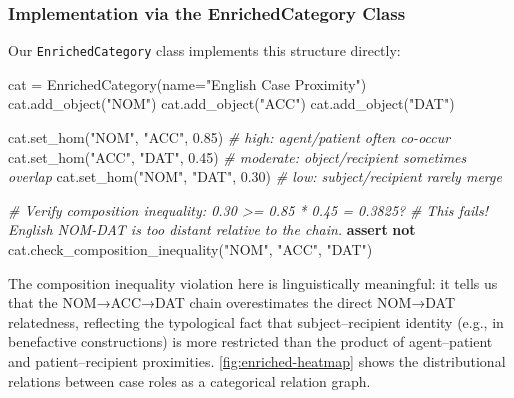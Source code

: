 \documentclass[
]{article}
\newenvironment{Shaded}{}{}
\newcommand{\CommentTok}[1]{\textcolor[rgb]{0.38,0.63,0.69}{\textit{#1}}}
\newcommand{\ControlFlowTok}[1]{\textcolor[rgb]{0.00,0.44,0.13}{\textbf{#1}}}
\newcommand{\FloatTok}[1]{\textcolor[rgb]{0.25,0.63,0.44}{#1}}
\newcommand{\KeywordTok}[1]{\textcolor[rgb]{0.00,0.44,0.13}{\textbf{#1}}}
\newcommand{\NormalTok}[1]{#1}
\newcommand{\OperatorTok}[1]{\textcolor[rgb]{0.40,0.40,0.40}{#1}}
\newcommand{\StringTok}[1]{\textcolor[rgb]{0.25,0.44,0.63}{#1}}
\numberwithin{equation}{section}
\begin{document}
\subsubsection{Implementation via the EnrichedCategory
Class}\label{implementation-via-the-enrichedcategory-class}

Our \texttt{EnrichedCategory} class implements this structure directly:

\begin{Shaded}
\begin{Highlighting}[]
\NormalTok{cat }\OperatorTok{=}\NormalTok{ EnrichedCategory(name}\OperatorTok{=}\StringTok{"English Case Proximity"}\NormalTok{)}
\NormalTok{cat.add\_object(}\StringTok{"NOM"}\NormalTok{)}
\NormalTok{cat.add\_object(}\StringTok{"ACC"}\NormalTok{)}
\NormalTok{cat.add\_object(}\StringTok{"DAT"}\NormalTok{)}

\NormalTok{cat.set\_hom(}\StringTok{"NOM"}\NormalTok{, }\StringTok{"ACC"}\NormalTok{, }\FloatTok{0.85}\NormalTok{)  }\CommentTok{\# high: agent/patient often co{-}occur}
\NormalTok{cat.set\_hom(}\StringTok{"ACC"}\NormalTok{, }\StringTok{"DAT"}\NormalTok{, }\FloatTok{0.45}\NormalTok{)  }\CommentTok{\# moderate: object/recipient sometimes overlap}
\NormalTok{cat.set\_hom(}\StringTok{"NOM"}\NormalTok{, }\StringTok{"DAT"}\NormalTok{, }\FloatTok{0.30}\NormalTok{)  }\CommentTok{\# low: subject/recipient rarely merge}

\CommentTok{\# Verify composition inequality: 0.30 \textgreater{}= 0.85 * 0.45 = 0.3825?}
\CommentTok{\# This fails! English NOM{-}DAT is too distant relative to the chain.}
\ControlFlowTok{assert} \KeywordTok{not}\NormalTok{ cat.check\_composition\_inequality(}\StringTok{"NOM"}\NormalTok{, }\StringTok{"ACC"}\NormalTok{, }\StringTok{"DAT"}\NormalTok{)}
\end{Highlighting}
\end{Shaded}

The composition inequality violation here is linguistically meaningful:
it tells us that the NOM→ACC→DAT chain overestimates the direct NOM→DAT
relatedness, reflecting the typological fact that subject--recipient
identity (e.g., in benefactive constructions) is more restricted than
the product of agent--patient and patient--recipient proximities.
\autoref{fig:enriched-heatmap} shows the distributional relations
between case roles as a categorical relation graph.
\end{document}
